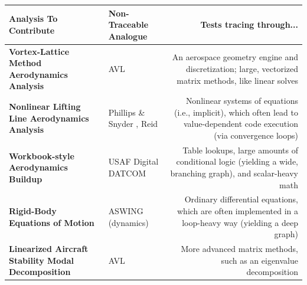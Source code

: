 \documentclass[12pt,vi,oneside,table]{report}
\begin{document}
\begin{table}[H]
\begin{adjustbox}{width=\textwidth}
            \begin{tabularx}{1.2\textwidth}{M E D}
                \toprule
                \textbf{Analysis To Contribute}                            & \textbf{Non-Traceable Analogue}                                               & \textbf{Tests tracing through...}                                                                                                 \\ \toprule
                \textbf{Vortex-Lattice Method Aerodynamics Analysis}       & AVL \cite{avl}                                                                & An aerospace geometry engine and discretization; large, vectorized matrix methods, like linear solves                             \\ \midrule
                \textbf{Nonlinear Lifting Line Aerodynamics Analysis}      & Phillips \& Snyder \cite{phillips_modern_2000}, Reid \cite{reid_general_2020} & Nonlinear systems of equations (i.e., implicit), which often lead to value-dependent code execution (via convergence loops) \\ \midrule
                \textbf{Workbook-style Aerodynamics Buildup}               & USAF Digital DATCOM \cite{datcom}                                             & Table lookups, large amounts of conditional logic (yielding a wide, branching graph), and scalar-heavy math                       \\ \midrule
                \textbf{Rigid-Body Equations of Motion}                    & ASWING (dynamics) \cite{aswing}                                               & Ordinary differential equations, which are often implemented in a loop-heavy way (yielding a deep graph)                          \\ \midrule
                \textbf{Linearized Aircraft Stability Modal Decomposition} & AVL \cite{avl}                                                                & More advanced matrix methods, such as an eigenvalue decomposition                                                                 \\
                \bottomrule
            \end{tabularx}

        \end{adjustbox}
    \end{table}
\end{document}
